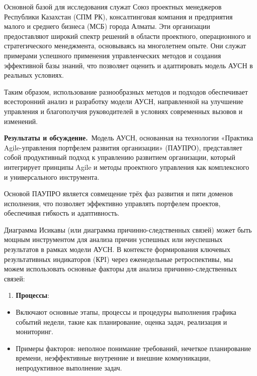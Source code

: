 Основной базой для исследования служат Союз проектных менеджеров
Республики Казахстан (СПМ РК), консалтинговая компания и предприятия
малого и среднего бизнеса (МСБ) города Алматы. Эти организации
предоставляют широкий спектр решений в области проектного, операционного
и стратегического менеджмента, основываясь на многолетнем опыте. Они
служат примерами успешного применения управленческих методов и создания
эффективной базы знаний, что позволяет оценить и адаптировать модель
АУСН в реальных условиях.

Таким образом, использование разнообразных методов и подходов
обеспечивает всесторонний анализ и разработку модели АУСН, направленной
на улучшение управления и благополучия руководителей в условиях
современных вызовов и изменений.

{\bfseries Результаты и обсуждение.}~Модель АУСН, основанная на технологии
«Практика Agile-управления портфелем развития организации» (ПАУПРО),
представляет собой продуктивный подход к управлению развитием
организации, который интегрирует принципы Agile и методы проектного
управления как комплексного и универсального инструмента.

Основой ПАУПРО является совмещение трёх фаз развития и пяти доменов
исполнения, что позволяет эффективно управлять портфелем проектов,
обеспечивая гибкость и адаптивность.

Диаграмма Исикавы (или диаграмма причинно-следственных связей) может
быть мощным инструментом для анализа причин успешных или неуспешных
результатов в рамках модели АУСН. В контексте формирования ключевых
результативных индикаторов (КРI) через еженедельные ретроспективы, мы
можем использовать основные факторы для анализа причинно-следственных
связей:

\begin{enumerate}
\def\labelenumi{\arabic{enumi}.}
\item
  {\bfseries Процессы}:
\end{enumerate}

\begin{itemize}
\item
  Включают основные этапы, процессы и процедуры выполнения графика
  событий недели, такие как планирование, оценка задач, реализация и
  мониторинг.
\item
  Примеры факторов: неполное понимание требований, нечеткое планирование
  времени, неэффективные внутренние и внешние коммуникации,
  непродуктивное выполнение задач.
\end{itemize}

